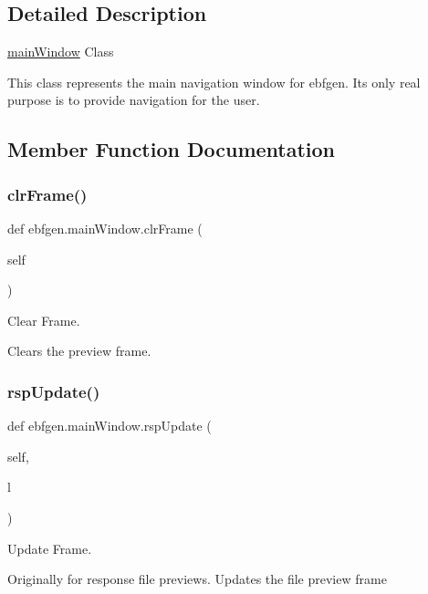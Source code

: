 \subsection{Detailed Description}
\hyperlink{classebfgen_1_1mainWindow}{main\+Window} Class 

This class represents the main navigation window for ebfgen. Its only real purpose is to provide navigation for the user. 

\subsection{Member Function Documentation}
\mbox{\label{classebfgen_1_1mainWindow_adef0b170df57fd1be0cca767f90e75d9}} 
\subsubsection{\texorpdfstring{clr\+Frame()}{clrFrame()}}
{\footnotesize\ttfamily def ebfgen.\+main\+Window.\+clr\+Frame (\begin{DoxyParamCaption}\item[{}]{self }\end{DoxyParamCaption})}



Clear Frame. 

Clears the preview frame. \mbox{\label{classebfgen_1_1mainWindow_a7422402e0cb017bfc763f23e448fb966}} 
\subsubsection{\texorpdfstring{rsp\+Update()}{rspUpdate()}}
{\footnotesize\ttfamily def ebfgen.\+main\+Window.\+rsp\+Update (\begin{DoxyParamCaption}\item[{}]{self,  }\item[{}]{l }\end{DoxyParamCaption})}



Update Frame. 

Originally for response file previews. Updates the file preview frame \mbox{\label{classebfgen_1_1mainWindow_ad6fe59c3a2a9e762160dd80263d52f9b}} 
